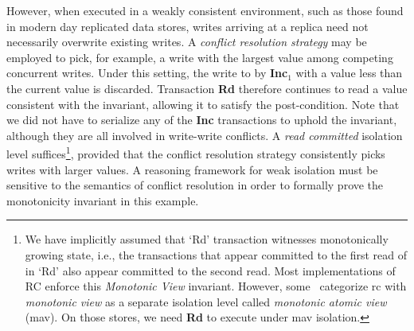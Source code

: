 However, when executed in a weakly consistent environment, such as
those found in modern day replicated data stores, writes arriving at a
replica need not necessarily overwrite existing writes. A
\emph{conflict resolution strategy} may be employed to pick, for
example, a write with the largest value among competing concurrent
writes. Under this setting, the write to  by {\bf Inc$_{1}$} with a
value less than the current value is discarded. Transaction
{\bf Rd} therefore continues to read a value consistent with the invariant, allowing it to satisfy the
post-condition. Note that we did not have to serialize any of the {\bf Inc}
transactions to uphold the invariant, although they are
all involved in write-write conflicts.  A \emph{read committed}
isolation level suffices\footnote{We have implicitly assumed that `Rd'
  transaction witnesses monotonically growing state, i.e., the
  transactions that appear committed to the first read of  in
  `Rd' also appear committed to the second read.  Most implementations
  of RC enforce this \emph{Monotonic View} invariant. However,
  some~\cite{pldi15,bailishat} categorize {\sc rc} with \emph{monotonic view} as a
  separate isolation level called \emph{monotonic atomic view}
  ({\sc mav}). On those stores, we need {\bf Rd} to execute under {\sc mav} isolation.}, provided that the
conflict resolution strategy consistently picks writes with larger
values. A reasoning framework for weak isolation must be sensitive to
the semantics of conflict resolution in order to formally prove the
monotonicity invariant in this example.

